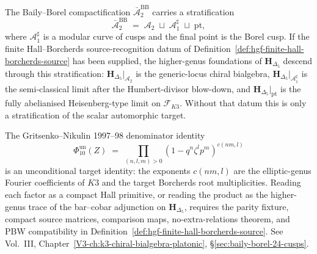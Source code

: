 \begin{remark}
\label{rem:hgfnd-2}
The Baily--Borel compactification $\bar{\mathcal A}_2^{\mathrm{BB}}$
carries a stratification
\[
\bar{\mathcal A}_2^{\mathrm{BB}} \;=\; \mathcal A_2 \;\sqcup\; \mathcal A_1^\sharp \;\sqcup\; \mathrm{pt},
\]
where $\mathcal A_1^\sharp$ is a modular curve of cusps and the final
point is the Borel cusp. If the finite Hall--Borcherds
source-recognition datum of
Definition~\ref{def:hgf-finite-hall-borcherds-source} has been
supplied, the higher-genus foundations of $\mathbf H_{\Delta_5}$
descend through this stratification:
$\mathbf H_{\Delta_5}|_{\mathcal A_2}$ is the generic-locus chiral
bialgebra, $\mathbf H_{\Delta_5}|_{\mathcal A_1^\sharp}$ is the
semi-classical limit after the Humbert-divisor blow-down, and
$\mathbf H_{\Delta_5}|_{\mathrm{pt}}$ is the fully abelianised
Heisenberg-type limit on $\mathcal F_{K3}$. Without that datum this is
only a stratification of the scalar automorphic target.

The Gritsenko--Nikulin 1997--98 denominator identity
\[
\Phi_{10}^{\mathrm{un}}(Z) \;=\; \prod_{(n,l,m)>0} (1 - q^n \zeta^l p^m)^{c(nm,l)}
\]
is an unconditional target identity: the exponents $c(nm,l)$ are the
elliptic-genus Fourier coefficients of $K3$ and the target
Borcherds root multiplicities. Reading each factor as a compact Hall
primitive, or reading the product as the higher-genus trace of the
bar--cobar adjunction on $\mathbf H_{\Delta_5}$, requires the parity
fixture, compact source matrices, comparison maps, no-extra-relations
theorem, and PBW compatibility in
Definition~\ref{def:hgf-finite-hall-borcherds-source}. See Vol.~III,
Chapter~\ref{V3-ch:k3-chiral-bialgebra-platonic},
\S\ref{sec:baily-borel-24-cusps}.
\end{remark}
